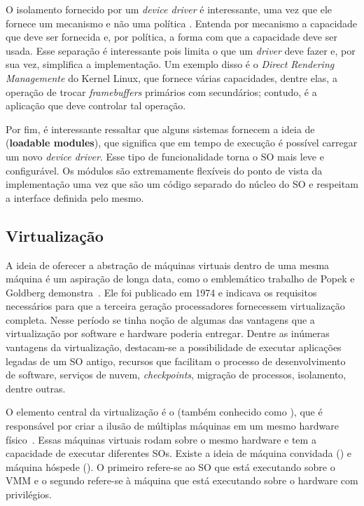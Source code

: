 O isolamento fornecido por um \emph{device driver} é interessante, uma vez que
ele fornece um mecanismo e não uma política \citep{ddbook}. Entenda por
mecanismo a capacidade que deve ser fornecida e, por política, a forma com
que a capacidade deve ser usada. Esse separação é interessante pois limita o
que um \emph{driver} deve fazer e, por sua vez, simplifica a implementação. Um
exemplo disso é o \emph{Direct Rendering Managemente} do Kernel Linux, que
fornece várias capacidades, dentre elas, a operação de trocar
\emph{framebuffers} primários com secundários; contudo, é a aplicação que deve
controlar tal operação.

Por fim, é interessante ressaltar que alguns sistemas fornecem a ideia de
 (\textbf{loadable modules}), que significa
que em tempo de execução é possível carregar um novo \emph{device driver}. Esse
tipo de funcionalidade torna o SO mais leve e configurável. Os módulos
são extremamente flexíveis do ponto de vista da implementação uma vez que são
um código separado do núcleo do SO e respeitam a interface definida pelo mesmo.

\subsection{Virtualização}
\label{sec:virtualizacao}


A ideia de oferecer a abstração de máquinas virtuais dentro de uma mesma
máquina é um aspiração de longa data, como o emblemático trabalho de Popek e
Goldberg demonstra~\citep{popek}. Ele foi publicado em 1974 e indicava os
requisitos necessários para que a terceira geração processadores fornecessem
virtualização completa. Nesse período se tinha noção de algumas das vantagens
que a virtualização por software e hardware poderia entregar. Dentre as
inúmeras vantagens da virtualização, destacam-se a possibilidade de executar
aplicações legadas de um SO antigo, recursos que facilitam o processo de
desenvolvimento de software, serviços de nuvem, \emph{checkpoints}, migração de
processos, isolamento, dentre outras.

O elemento central da virtualização é o  (também
conhecido como ), que é responsável por
criar a ilusão de múltiplas máquinas em um mesmo hardware
físico~\citep{tanenbaum}. Essas máquinas virtuais rodam sobre o mesmo hardware
e tem a capacidade de executar diferentes SOs. Existe a ideia de máquina
convidada () e máquina hóspede (). O
primeiro refere-se ao SO que está executando sobre o VMM e o segundo refere-se
à máquina que está executando sobre o hardware com privilégios.

